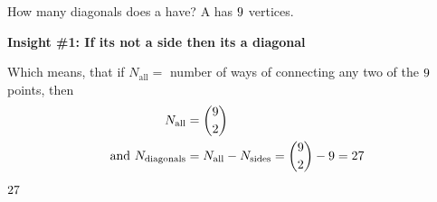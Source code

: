 



\question[2] How many diagonals does a \textbf{\va } have? A \text{\va } has $9$ vertices. 

\watchout

\begin{solution}[\mcq]
  \textbf{Insight \#1: If its not a side then its a diagonal}

  Which means, that if $N_{\text{all}} = $ number of ways of connecting any two of the $9$ points, then 
  \begin{align}
    N_{\text{all}} &= \binom{9}{2} \\
    \text{ and }N_{\text{diagonals}} &= N_{\text{all}} - N_{\text{sides}} = \binom{9}{2} - 9 = 27
  \end{align}
\end{solution}
\ifprintanswers\begin{codex}$27$\end{codex}\fi

